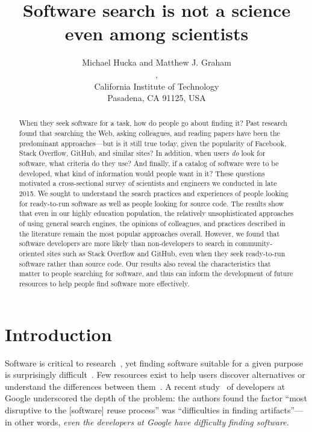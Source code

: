 \documentclass{casicswhitepaper}
\begin{document}
\title{\vspace*{-3ex}Software search is not a science even among scientists}
\date{\vspace*{-1ex}\dateAndVersion}
\author{Michael Hucka and Matthew J. Graham\\
,\quad{}\\
California Institute of Technology\\
Pasadena, CA 91125, USA}
\maketitle

\begin{abstract}
  When they seek software for a task, how do people go about finding it?  Past research found that searching the Web, asking colleagues, and reading papers have been the predominant approaches---but is it still true today, given the popularity of Facebook, Stack Overflow, GitHub, and similar sites?  In addition, when users \emph{do} look for software, what criteria do they use?  And finally, if a catalog of software were to be developed, what kind of information would people want in it?  These questions motivated a cross-sectional survey of scientists and engineers we conducted in late 2015.  We sought to understand the search practices and experiences of people looking for ready-to-run software as well as people looking for source code.  The results show that even in our highly education population, the relatively unsophisticated approaches of using general search engines, the opinions of colleagues, and practices described in the literature remain the most popular approaches overall.  However, we found that software developers are more likely than non-developers to search in community-oriented sites such as Stack Overflow and GitHub, even when they seek ready-to-run software rather than source code.  Our results also reveal the characteristics that matter to people searching for software, and thus can inform the development of future resources to help people find software more effectively.
\end{abstract}


\section{Introduction}

Software is critical to research~, yet finding software suitable for a given purpose is surprisingly difficult~\cite{howison2015software, cannata_2005, Bourne::2015, white2014nih}.  Few resources exist to help users discover alternatives or understand the differences between them~\cite{white2014nih}.  A recent study~\cite{bauer2014exploratory} of developers at Google underscored the depth of the problem: the authors found the factor ``most disruptive to the [software] reuse process'' was ``difficulties in finding artifacts''---in other words, \emph{even the developers at Google have difficulty finding software}.
\end{document}
